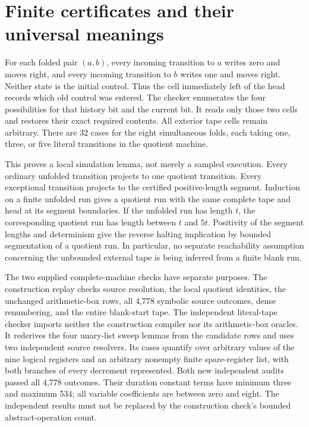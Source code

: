 \section{Finite certificates and their universal meanings}

For each folded pair $(a,b)$, every incoming transition to $a$ writes zero
and moves right, and every incoming transition to $b$ writes one and moves
right.  Neither state is the initial control.  Thus the cell immediately
left of the head records which old control was entered.  The checker
enumerates the four possibilities for that history bit and the current
bit.  It reads only those two cells and restores their exact required
contents.  All exterior tape cells remain arbitrary.  There are 32 cases
for the eight simultaneous folds, each taking one, three, or five literal
transitions in the quotient machine.

This proves a local simulation lemma, not merely a sampled execution.
Every ordinary unfolded transition projects to one quotient transition.
Every exceptional transition projects to the certified positive-length
segment.  Induction on a finite unfolded run gives a quotient run with the
same complete tape and head at its segment boundaries.  If the unfolded run
has length $t$, the corresponding quotient run has length between $t$ and
$5t$.  Positivity of the segment lengths and determinism give the reverse
halting implication by bounded segmentation of a quotient run.  In
particular, no separate reachability assumption concerning the unbounded
external tape is being inferred from a finite blank run.

The two supplied complete-machine checks have separate purposes.  The
construction replay checks source resolution, the local quotient identities,
the unchanged arithmetic-box rows, all 4,778 symbolic source outcomes, dense
renumbering, and the entire blank-start tape.  The independent literal-tape
checker imports neither the construction compiler nor its arithmetic-box
oracles.  It rederives the four unary-list sweep lemmas from the candidate
rows and uses two independent source resolvers.  Its cases quantify over
arbitrary values of the nine logical registers and an arbitrary nonempty finite
spare-register list, with both branches of every decrement represented.  Both new
independent audits passed all 4,778 outcomes.  Their duration constant
terms have minimum three and maximum 534; all variable coefficients are
between zero and eight.  The independent results must not be replaced by
the construction check's bounded abstract-operation count.

